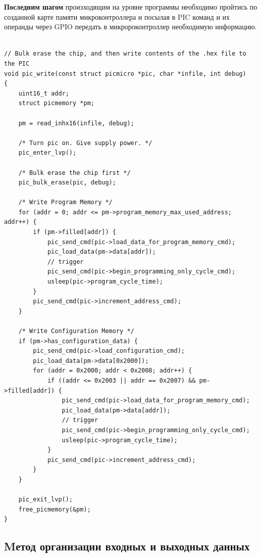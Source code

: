 \textbf{Последним шагом} произходящим на уровне программы необходимо пройтись по созданной карте памяти микроконтроллера и посылая в PIC команд и их операнды через GPIO передать в 
микророконтроллер необходимую информацию.


\begin{small}
\begin{verbatim}

// Bulk erase the chip, and then write contents of the .hex file to the PIC
void pic_write(const struct picmicro *pic, char *infile, int debug)
{
    uint16_t addr;
    struct picmemory *pm;

    pm = read_inhx16(infile, debug);

    /* Turn pic on. Give supply power. */
    pic_enter_lvp();

    /* Bulk erase the chip first */
    pic_bulk_erase(pic, debug);

    /* Write Program Memory */
    for (addr = 0; addr <= pm->program_memory_max_used_address; addr++) {
        if (pm->filled[addr]) {
            pic_send_cmd(pic->load_data_for_program_memory_cmd);
            pic_load_data(pm->data[addr]);
            // trigger
            pic_send_cmd(pic->begin_programming_only_cycle_cmd);
            usleep(pic->program_cycle_time);
        }
        pic_send_cmd(pic->increment_address_cmd);
    }

    /* Write Configuration Memory */
    if (pm->has_configuration_data) {
        pic_send_cmd(pic->load_configuration_cmd);
        pic_load_data(pm->data[0x2000]);
        for (addr = 0x2000; addr < 0x2008; addr++) {
            if ((addr <= 0x2003 || addr == 0x2007) && pm->filled[addr]) {
                pic_send_cmd(pic->load_data_for_program_memory_cmd);
                pic_load_data(pm->data[addr]);
                // trigger
                pic_send_cmd(pic->begin_programming_only_cycle_cmd);
                usleep(pic->program_cycle_time);
            }
            pic_send_cmd(pic->increment_address_cmd);
        }
    }
    
    pic_exit_lvp();
    free_picmemory(&pm);
}
\end{verbatim}
\end{small}



\subsection{Mетод организации входных и выходных данных}

